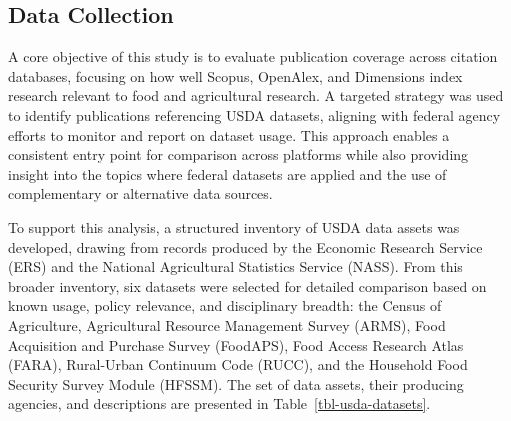 \documentclass[
  letterpaper,
  DIV=11,
  numbers=noendperiod]{scrartcl}
\begin{document}
\subsection{Data Collection}\label{data-collection}

A core objective of this study is to evaluate publication coverage
across citation databases, focusing on how well Scopus, OpenAlex, and
Dimensions index research relevant to food and agricultural research. A
targeted strategy was used to identify publications referencing USDA
datasets, aligning with federal agency efforts to monitor and report on
dataset usage. This approach enables a consistent entry point for
comparison across platforms while also providing insight into the topics
where federal datasets are applied and the use of complementary or
alternative data sources.

To support this analysis, a structured inventory of USDA data assets was
developed, drawing from records produced by the Economic Research
Service (ERS) and the National Agricultural Statistics Service (NASS).
From this broader inventory, six datasets were selected for detailed
comparison based on known usage, policy relevance, and disciplinary
breadth: the Census of Agriculture, Agricultural Resource Management
Survey (ARMS), Food Acquisition and Purchase Survey (FoodAPS), Food
Access Research Atlas (FARA), Rural-Urban Continuum Code (RUCC), and the
Household Food Security Survey Module (HFSSM). The set of data assets,
their producing agencies, and descriptions are presented in
Table~\ref{tbl-usda-datasets}.
\end{document}
